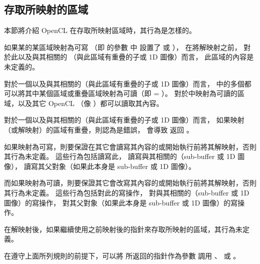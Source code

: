 \subsection{存取所映射的區域}

本節將介紹 OpenCL  在存取所映射區域時，其行為是怎樣的。

如果某的某區域映射為可寫
（即  的參數  中
設置了  或  ），
在將解映射之前，
對於此以及與其相關的
（與此區域有重疊的子或 1D 圖像）而言，
此區域的內容是未定義的。

對於一個以及與其相關的（與此區域有重疊的子或 1D 圖像）而言，
中的多個都可以將其中某個區域或重疊區域映射為可讀（即  = ）。
對於中映射為可讀的區域，以及其它 OpenCL （像  ）都可以讀取其內容。

對於一個以及與其相關的（與此區域有重疊的子或 1D 圖像）而言，
如果映射（或解映射）的區域有重疊，則認為是錯誤，
會導致  返回 。

如果映射為可寫，則要保證在其它會讀寫其內容的或開始執行前將其解映射，否則其行為未定義。
這些行為包括讀寫此，
讀寫與其相關的（sub-buffer 或 1D 圖像），
讀寫其父對象（如果此本身是 sub-buffer 或 1D 圖像）。

而如果映射為可讀，則要保證其它會改寫其內容的或開始執行前將其解映射，否則其行為未定義。
這些行為包括對此的寫操作，
對與其相關的（sub-buffer 或 1D 圖像）的寫操作，
對其父對象（如果此本身是 sub-buffer 或 1D 圖像）的寫操作。

在解映射後，如果繼續使用之前映射後的指針來存取所映射的區域，其行為未定義。

在遵守上面所列規則的前提下，可以將  所返回的指針作為參數  調用
 、
 或 。

